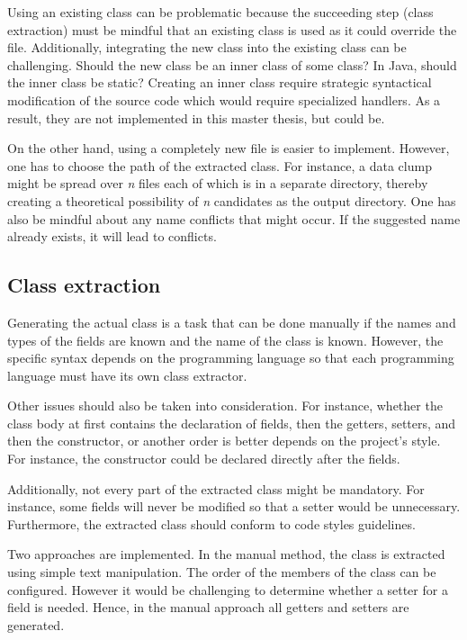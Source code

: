 Using an existing class can be problematic because the succeeding step (class extraction) must be mindful that an existing class is used as it could override the file. Additionally, integrating the new class into the existing class can be challenging. Should the new class be an inner class of some class? In Java, should the inner class be static?  Creating an inner class require strategic syntactical modification of the source code which would require specialized handlers. As a result, they are not implemented in this master thesis, but could be. 

On the other hand, using a completely new file is easier to implement. However, one has to choose the path of the extracted class. For instance, a data clump might be spread over \textit{n} files each of which is in a separate directory, thereby creating a theoretical possibility of \textit{n} candidates as the output directory. 
One has also be mindful about any name conflicts that might occur. If the suggested name already exists, it will lead to conflicts.


\subsection{Class extraction}

Generating the actual class is a task that can be done manually if the names and types of the fields are known and the name of the class is known. However, the specific syntax depends on the programming language so that each programming language must have its own class extractor.

Other issues should also be taken into consideration. For instance, whether the class body at first contains the declaration of fields, then the getters, setters, and then the constructor, or another order is better depends on the project's style. For instance, the constructor could be declared directly after the fields.

Additionally, not every part of the extracted class might be mandatory. For instance, some fields will never be modified so that a setter would be unnecessary. Furthermore, the extracted class should conform to code styles guidelines. 

Two approaches are implemented. In the manual method, the class is extracted using simple text manipulation. The order of the members of the class can be configured.  However it would be challenging to determine whether a setter for a field is needed. Hence, in the manual approach all getters and setters are generated.

